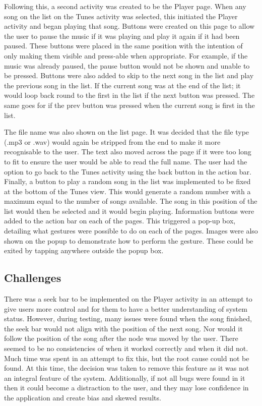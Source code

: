 \documentclass{l4proj}
\begin{document}
Following this, a second activity was created to be the Player page. When any song on the list on the Tunes activity was selected, this initiated the Player activity and began playing that song. Buttons were created on this page to allow the user to pause the music if it was playing and play it again if it had been paused. These buttons were placed in the same position with the intention of only making them visible and press-able when appropriate. For example, if the music was already paused, the pause button would not be shown and unable to be pressed. Buttons were also added to skip to the next song in the list and play the previous song in the list. If the current song was at the end of the list; it would loop back round to the first in the list if the next button was pressed. The same goes for if the prev button was pressed when the current song is first in the list. 

The file name was also shown on the list page. It was decided that the file type (.mp3 or .wav) would again be stripped from the end to make it more recognisable to the user. The text also moved across the page if it were too long to fit to ensure the user would be able to read the full name. The user had the option to go back to the Tunes activity using the back button in the action bar. Finally, a button to play a random song in the list was implemented to be fixed at the bottom of the Tunes view. This would generate a random number with a maximum equal to the number of songs available. The song in this position of the list would then be selected and it would begin playing. Information buttons were added to the action bar on each of the pages. This triggered a pop-up box, detailing what gestures were possible to do on each of the pages. Images were also shown on the popup to demonstrate how to perform the gesture. These could be exited by tapping anywhere outside the popup box.


\subsection{Challenges}
There was a seek bar to be implemented on the Player activity in an attempt to give users more control and for them to have a better understanding of system status. However, during testing, many issues were found when the song finished, the seek bar would not align with the position of the next song. Nor would it follow the position of the song after the node was moved by the user. There seemed to be no consistencies of when it worked correctly and when it did not. Much time was spent in an attempt to fix this, but the root cause could not be found. At this time, the decision was taken to remove this feature as it was not an integral feature of the system. Additionally, if not all bugs were found in it then it could become a distraction to the user, and they may lose confidence in the application and create bias and skewed results.
\end{document}

